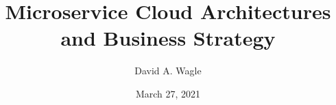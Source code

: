 \title{Microservice Cloud Architectures and Business Strategy}
\author{David A. Wagle}
\date{March 27, 2021}
